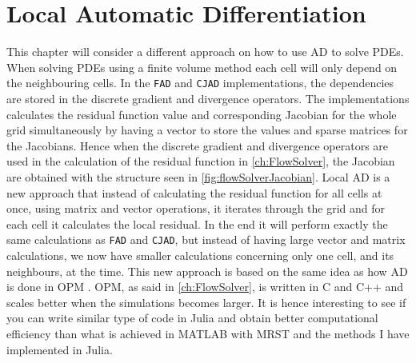 \chapter{Local Automatic Differentiation}
\label{ch:LocalAD}
This chapter will consider a different approach on how to use AD to solve PDEs. When solving PDEs using a finite volume method each cell will only depend on the neighbouring cells. In the \texttt{FAD} and \texttt{CJAD} implementations, the dependencies are stored in the discrete gradient and divergence operators. The implementations calculates the residual function value and corresponding Jacobian for the whole grid simultaneously by having a vector to store the values and sparse matrices for the Jacobians. Hence when the discrete gradient and divergence operators are used in the calculation of the residual function in \autoref{ch:FlowSolver}, the Jacobian are obtained with the structure seen in \autoref{fig:flowSolverJacobian}. Local AD is a new approach that instead of calculating the residual function for all cells at once, using matrix and vector operations, it iterates through the grid and for each cell it calculates the local residual. In the end it will perform exactly the same calculations as \texttt{FAD} and \texttt{CJAD}, but instead of having large vector and matrix calculations, we now have smaller calculations concerning only one cell, and its neighbours, at the time. This new approach is based on the same idea as how AD is done in OPM \emph{\citep{OPM}}. OPM, as said in \autoref{ch:FlowSolver}, is written in C and C++ and scales better when the simulations becomes larger. It is hence interesting to see if you can write similar type of code in Julia and obtain better computational efficiency than what is achieved in MATLAB with MRST and the methods I have implemented in Julia.

